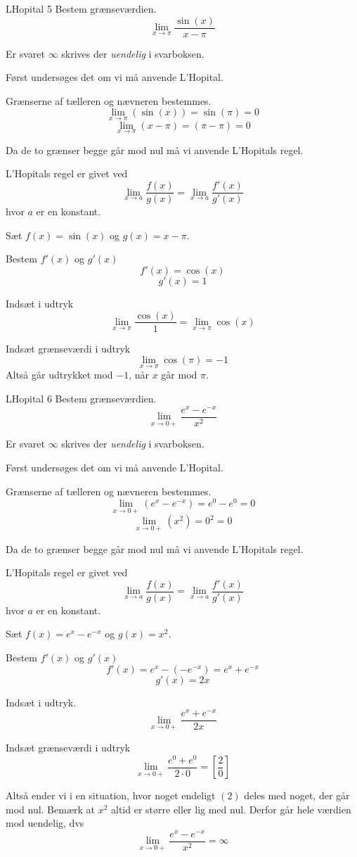 \documentclass{article}
\begin{document}
\begin{exercise}{LHopital 5}
Bestem grænseværdien.
\[
\lim_{x \to \pi} \frac{\sin(x)}{x - \pi}
\]

Er svaret $\infty$ skrives der \emph{uendelig} i svarboksen.


\hint
Først undersøges det om vi må anvende L'Hopital.

\hint
Grænserne af tælleren og nævneren bestemmes.
\[
\lim_{x \to \pi} (\sin(x)) = \sin(\pi) = 0
\]
\[
\lim_{x \to \pi} (x - \pi) = (\pi - \pi) = 0
\]

\hint
Da de to grænser begge går mod nul må vi anvende L'Hopitals regel.

\hint
L'Hopitals regel er givet ved
\[
\lim_{x \to a} \frac{f(x)}{g(x)} = \lim_{x \to a} \frac{f'(x)}{g'(x)}
\]
hvor $a$ er en konstant.

\hint
Sæt $f(x) = \sin(x)$ og $g(x) = x - \pi$.

\hint
Bestem $f'(x)$ og $g'(x)$
\[
f'(x) = \cos(x)
\]
\[
g'(x) = 1
\]

\hint
Indsæt i udtryk
\[
\lim_{x \to \pi} \frac{\cos(x)}{1} = \lim_{x \to \pi} \cos(x)
\]

\hint
Indsæt grænseværdi i udtryk
\[
\lim_{x \to \pi} \cos(\pi) = -1
\]
Altså går udtrykket mod $ -1$, når $x$ går mod $\pi$.

\end{exercise}

\begin{exercise}{LHopital 6}
Bestem grænseværdien.
\[
\lim_{x \to 0+} \frac{e^x - e^{-x}}{x^2}
\]

Er svaret $\infty$ skrives der \emph{uendelig} i svarboksen.


\hint
Først undersøges det om vi må anvende L'Hopital.

\hint
Grænserne af tælleren og nævneren bestemmes.
\[
\lim_{x \to 0+} (e^x - e^{-x}) = e^0 - e^0 = 0
\]
\[
\lim_{x \to 0+} (x^2) = 0^2 = 0
\]

\hint
Da de to grænser begge går mod nul må vi anvende L'Hopitals regel.

\hint
L'Hopitals regel er givet ved
\[
\lim_{x \to a} \frac{f(x)}{g(x)} = \lim_{x \to a} \frac{f'(x)}{g'(x)}
\]
hvor $a$ er en konstant.

\hint
Sæt $f(x) = e^x - e^{-x} $ og $g(x) = x^2$.

\hint
Bestem $f'(x)$ og $g'(x)$
\[
f'(x) = e^x - \left(- e^{-x} \right) = e^x + e^{-x}
\]
\[
g'(x) = 2x
\]

\hint
Indsæt i udtryk.
\[
\lim_{x \to 0+} \frac{e^x + e^{-x}}{2x}
\]

\hint
Indsæt grænseværdi i udtryk
\[
\lim_{x \to 0+} \frac{e^0 + e^0}{2 \cdot 0} = \left[ \frac{2}{0} \right]
\]

\hint
Altså ender vi i en situation, hvor noget endeligt $(2)$ deles med noget, der går mod nul. Bemærk at $x^2$ altid er større eller lig med nul. Derfor går hele værdien mod uendelig, dvs
\[
\lim_{x \to 0+} \frac{e^x - e^{-x}}{x^2} = \infty
\]

\end{exercise}
\end{document}
